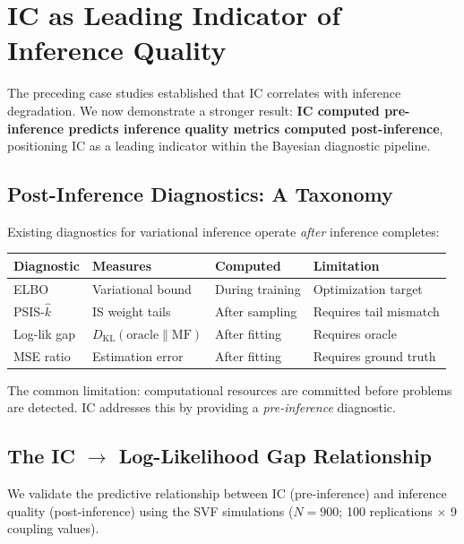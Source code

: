 \documentclass[10pt]{article} %
\theoremstyle{plain}
\theoremstyle{definition}
\newcommand{\KL}{D_{\mathrm{KL}}}
\begin{document}
\section{IC as Leading Indicator of Inference Quality}
\label{sec:psis}

The preceding case studies established that IC correlates with inference degradation. We now demonstrate a stronger result: \textbf{IC computed pre-inference predicts inference quality metrics computed post-inference}, positioning IC as a leading indicator within the Bayesian diagnostic pipeline.

\subsection{Post-Inference Diagnostics: A Taxonomy}

Existing diagnostics for variational inference operate \emph{after} inference completes:

\begin{center}
\begin{tabular}{llll}
\toprule
Diagnostic & Measures & Computed & Limitation \\
\midrule
ELBO & Variational bound & During training & Optimization target \\
PSIS-$\hat{k}$ & IS weight tails & After sampling & Requires tail mismatch \\
Log-lik gap & $\KL(\text{oracle} \| \text{MF})$ & After fitting & Requires oracle \\
MSE ratio & Estimation error & After fitting & Requires ground truth \\
\bottomrule
\end{tabular}
\end{center}

\noindent The common limitation: computational resources are committed before problems are detected. IC addresses this by providing a \emph{pre-inference} diagnostic.

\subsection{The IC $\to$ Log-Likelihood Gap Relationship}

We validate the predictive relationship between IC (pre-inference) and inference quality (post-inference) using the SVF simulations ($N = 900$; 100 replications $\times$ 9 coupling values).
\end{document}
